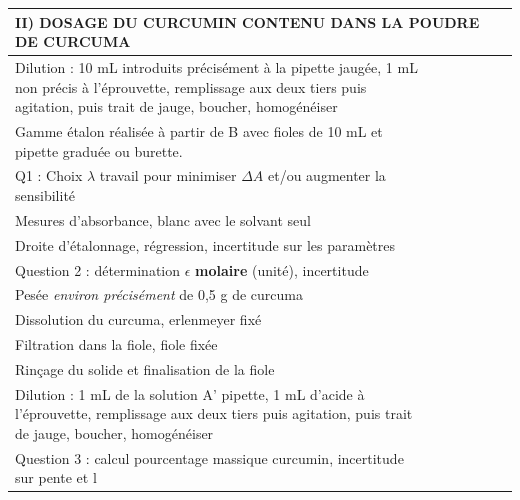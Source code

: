 \documentclass[12pt,a3paper,landscape]{exam}
\begin{document}
\begin{longtable}{|p{6cm}|l|m{10.5cm}|l|m{10.5cm}|l|m{10.5cm}|}
\multicolumn{7}{|l|}{\textbf{II) DOSAGE DU CURCUMIN CONTENU DANS LA POUDRE DE CURCUMA}}\\
\hline
Dilution : 10 mL introduits précisément à la pipette jaugée, 1 mL non précis à l'éprouvette, remplissage aux deux tiers puis agitation, puis trait de jauge, boucher, homogénéiser &&&&&&\\[30 pt]
\hline
Gamme étalon réalisée à partir de B avec fioles de 10 mL et pipette graduée ou burette.  &&&&&&\\[30 pt]
\hline
Q1 : Choix $\lambda$ travail pour minimiser $\Delta A$  et/ou augmenter la sensibilité &&&&&&\\[30 pt]
\hline
Mesures d'absorbance, blanc avec le solvant seul &&&&&&\\[30 pt]
\hline
Droite d'étalonnage, régression, incertitude sur les paramètres &&&&&&\\[30 pt]
\hline
Question 2 : détermination $\epsilon$ \textbf{molaire} (unité), incertitude &&&&&&\\[30 pt]
\hline
Pesée \textit{environ précisément} de 0,5 g de curcuma &&&&&&\\[30 pt]
\hline
Dissolution du curcuma, erlenmeyer fixé &&&&&&\\[30 pt]
\hline
Filtration dans la fiole, fiole fixée &&&&&&\\[30 pt]
\hline
Rinçage du solide et finalisation de la fiole &&&&&&\\[30 pt]
\hline
Dilution : 1 mL de la solution A' pipette, 1 mL d'acide à l'éprouvette, remplissage aux deux tiers puis agitation, puis trait de jauge, boucher, homogénéiser &&&&&&\\[30 pt]
\hline
Question 3 : calcul pourcentage massique curcumin, incertitude sur pente et l &&&&&&\\[30 pt]
\hline


\end{longtable}
\end{document}
